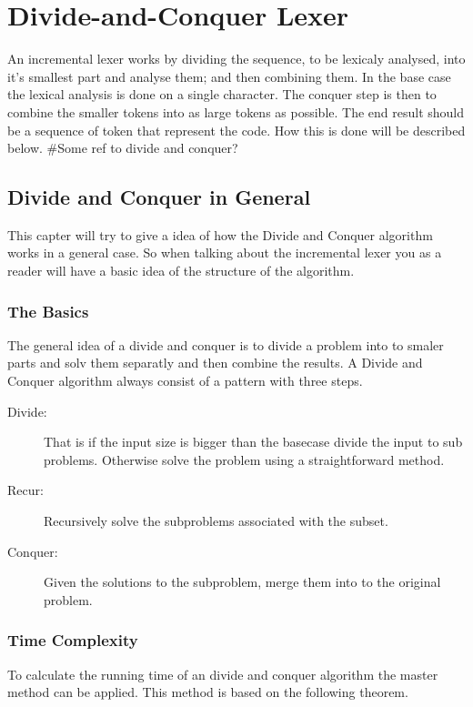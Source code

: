 \chapter{Divide-and-Conquer Lexer}
An incremental lexer works by dividing the sequence, to be lexicaly analysed,
into it's smallest part and analyse them; and then combining them. In the base
case the lexical analysis is done on a single character. The conquer step is
then to combine the smaller tokens into as large tokens as possible. The end
result should be a sequence of token that represent the code. How this is done
will be described below. \#Some ref to divide and conquer?

\section{Divide and Conquer in General}
This capter will try to give a idea of how the Divide and Conquer algorithm works in a general case. So when talking about the incremental lexer you as a reader will have a basic idea of the structure of the algorithm.

\subsection{The Basics}
The general idea of a divide and conquer is to divide a problem into to smaler parts and solv them separatly and then combine the results. 
A Divide and Conquer algorithm always consist of a pattern with three steps. \cite{Goodrich}
\begin{description}
\item[Divide:] That is if the input size is bigger than the basecase divide the input to sub problems. Otherwise solve the problem using a straightforward method.
\item[Recur:] Recursively solve the subproblems associated with the subset.
\item[Conquer:] Given the solutions to the subproblem, merge them into to the original problem.
\end{description}

\subsection{Time Complexity}
To calculate the running time of an divide and conquer algorithm the master method can be applied. \cite{Cormen} This method is based on the following theorem.

